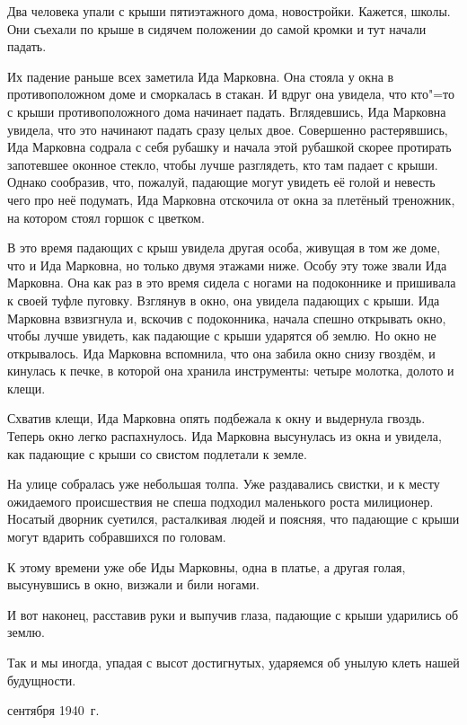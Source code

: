 Два человека упали с крыши пятиэтажного дома, новостройки. Кажется, школы.
Они съехали по крыше в сидячем положении до самой кромки и тут начали падать.

Их падение раньше всех заметила Ида Марковна. Она стояла у окна в противоположном
доме и сморкалась в стакан. И вдруг она увидела, что кто"=то с крыши
противоположного дома начинает падать. Вглядевшись, Ида Марковна увидела, что это
начинают падать сразу целых двое. Совершенно растерявшись, Ида Марковна содрала
с себя рубашку и начала этой рубашкой скорее протирать запотевшее оконное стекло,
чтобы лучше разглядеть, кто там падает с крыши. Однако сообразив, что, пожалуй,
падающие могут увидеть её голой и невесть чего про неё подумать, Ида Марковна
отскочила от окна за плетёный треножник, на котором стоял горшок с цветком.

В это время падающих с крыш увидела другая особа, живущая в том же доме, что
и Ида Марковна, но только двумя этажами ниже. Особу эту тоже звали Ида Марковна.
Она как раз в это время сидела с ногами на подоконнике и пришивала к своей туфле
пуговку. Взглянув в окно, она увидела падающих с крыши. Ида Марковна взвизгнула
и, вскочив с подоконника, начала спешно открывать окно, чтобы лучше увидеть, как
падающие с крыши ударятся об землю. Но окно не открывалось. Ида Марковна
вспомнила, что она забила окно снизу гвоздём, и кинулась к печке, в которой она
хранила инструменты: четыре молотка, долото и клещи.

Схватив клещи, Ида Марковна опять подбежала к окну и выдернула гвоздь.
Теперь окно легко распахнулось. Ида Марковна высунулась из окна и увидела, как
падающие с крыши со свистом подлетали к земле.

На улице собралась уже небольшая толпа. Уже раздавались свистки, и к месту
ожидаемого происшествия не спеша подходил маленького роста милиционер. Носатый
дворник суетился, расталкивая людей и поясняя, что падающие с крыши могут вдарить
собравшихся по головам.

К этому времени уже обе Иды Марковны, одна в платье, а другая голая,
высунувшись в окно, визжали и били ногами.

И вот наконец, расставив руки и выпучив глаза, падающие с крыши ударились
об землю.

Так и мы иногда, упадая с высот достигнутых, ударяемся об унылую клеть нашей
будущности.

\medskip
{} сентября 1940~г.